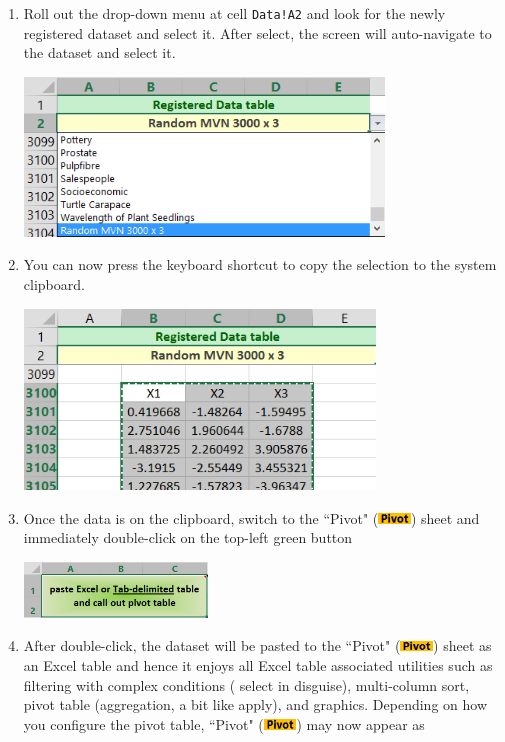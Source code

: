 \documentclass[article]{jss}
\newcommand{\shtPivot}{``Pivot" (\includegraphics[height=8pt, keepaspectratio=true]{PivotSheetTab_png}) }
\begin{document}
\begin{enumerate}
\begin{center}
        \end{center}
        \item Roll out the drop-down menu at cell \texttt{Data!A2} and look for the newly registered dataset and select it. After select, the screen will auto-navigate to the dataset and select it.
        \begin{center}
        \includegraphics[height=120pt, keepaspectratio=true]{DataSheet_LocateDatasetViaMenu_png}
        \end{center}
        \item You can now press the keyboard shortcut to copy the selection to the system clipboard.
        \begin{center}
        \includegraphics[height=136pt,keepaspectratio=true]{DataSheet_CopyDataset_png}
        \end{center}
        \item Once the data is on the clipboard, switch to the \shtPivot sheet and immediately double-click on the top-left green button
        \begin{center}
        \includegraphics[height=42pt, keepaspectratio=true]{PivotPasteButton_png}
        \end{center}
        \item After double-click, the dataset will be pasted to the \shtPivot sheet as an Excel table and hence it enjoys all Excel table associated utilities such as filtering with complex conditions ( select in disguise), multi-column sort, pivot table (aggregation, a bit like  apply), and graphics. Depending on how you configure the pivot table, \shtPivot may now appear as

\end{enumerate}
\end{document}
